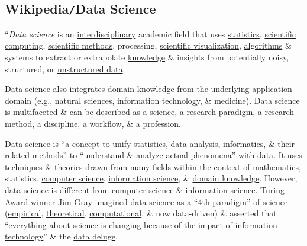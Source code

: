 \documentclass{article}
\begin{document}
\subsection{Wikipedia{\tt/}Data Science}
``{\it Data science} is an \href{https://en.wikipedia.org/wiki/Interdisciplinary}{interdisciplinary} academic field that uses \href{https://en.wikipedia.org/wiki/Statistics}{statistics}, \href{https://en.wikipedia.org/wiki/Scientific_computing}{scientific computing}, \href{https://en.wikipedia.org/wiki/Scientific_method}{scientific methods}, processing, \href{https://en.wikipedia.org/wiki/Scientific_visualization}{scientific visualization}, \href{https://en.wikipedia.org/wiki/Algorithm}{algorithms} \& systems to extract or extrapolate \href{https://en.wikipedia.org/wiki/Knowledge}{knowledge} \& insights from potentially noisy, structured, or \href{https://en.wikipedia.org/wiki/Unstructured_data}{unstructured data}.

Data science also integrates domain knowledge from the underlying application domain (e.g., natural sciences, information technology, \& medicine). Data science is multifaceted \& can be described as a science, a research paradigm, a research method, a discipline, a workflow, \& a profession.

Data science is ``a concept to unify statistics, \href{https://en.wikipedia.org/wiki/Data_analysis}{data analysis}, \href{https://en.wikipedia.org/wiki/Informatics}{informatics}, \& their related \href{https://en.wikipedia.org/wiki/Scientific_method}{methods}'' to ``understand \& analyze actual \href{https://en.wikipedia.org/wiki/Phenomena}{phenomena}'' with \href{https://en.wikipedia.org/wiki/Data}{data}. It uses techniques \& theories drawn from many fields within the context of mathematics, statistics, \href{https://en.wikipedia.org/wiki/Computer_science}{computer science}, \href{https://en.wikipedia.org/wiki/Information_science}{information science}, \& \href{https://en.wikipedia.org/wiki/Domain_knowledge}{domain knowledge}. However, data science is different from \href{https://en.wikipedia.org/wiki/Computer_science}{computer science} \& \href{https://en.wikipedia.org/wiki/Information_science}{information science}. \href{https://en.wikipedia.org/wiki/Turing_Award}{Turing Award} winner \href{https://en.wikipedia.org/wiki/Jim_Gray_(computer_scientist)}{Jim Gray} imagined data science as a ``4th paradigm'' of science (\href{https://en.wikipedia.org/wiki/Empirical_research}{empirical}, \href{https://en.wikipedia.org/wiki/Basic_research}{theoretical}, \href{https://en.wikipedia.org/wiki/Computational_science}{computational}, \& now data-driven) \& asserted that ``everything about science is changing because of the impact of \href{https://en.wikipedia.org/wiki/Information_technology}{information technology}'' \& the \href{https://en.wikipedia.org/wiki/Information_explosion}{data deluge}.
\end{document}
